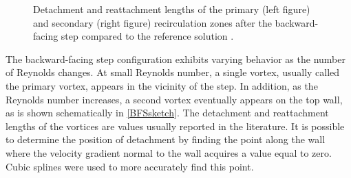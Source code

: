 \begin{figure}[tb]
	\centering
	\caption{ Detachment and reattachment lengths of the primary (left figure) and secondary (right figure) recirculation zones after the backward-facing step compared to the reference solution \citep{biswasBackwardFacingStepFlows2004}.}
	\label{fig:Re_De_Attachmentlengths}
\end{figure}
The backward-facing step configuration exhibits varying behavior as the number of Reynolds changes. At small Reynolds number, a single vortex, usually called the primary vortex, appears in the vicinity of the step. In addition, as the Reynolds number increases, a second vortex eventually appears on the top wall, as is shown schematically in  \cref{BFSsketch}. 
The detachment and reattachment lengths of the vortices are values usually reported in the literature. It is possible to determine the position of detachment by finding the point along the wall where the velocity gradient normal to the wall acquires a value equal to zero. Cubic splines were used to more accurately find this point.

